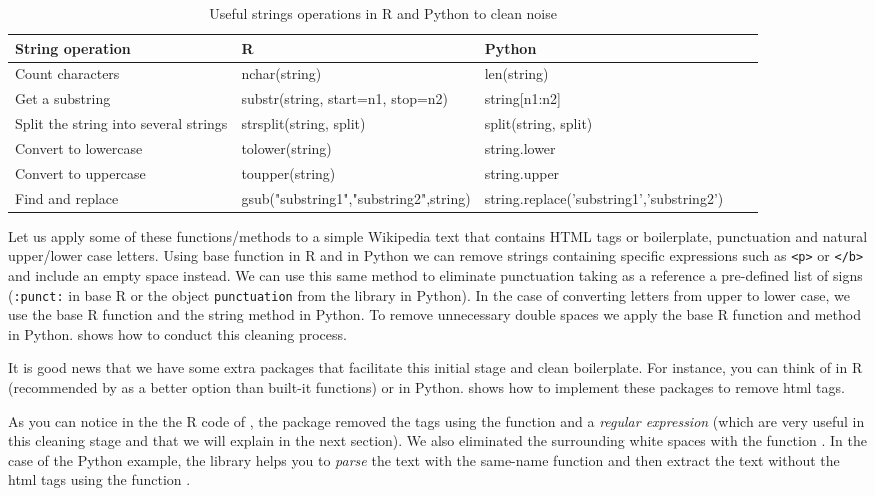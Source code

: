 \begin{table}
  \caption{\label{tab:stringoperations}Useful strings operations in R and Python to clean noise}{
  \begin{tabularx}{\textwidth}{lllll}
    \toprule
String operation      & R   & Python\\ \midrule
Count characters      & nchar(string) & len(string)  \\
Get a substring       & substr(string, start=n1, stop=n2) & string[n1:n2]            \\
Split the string into several strings   & strsplit(string, split) & split(string, split)             \\ 
Convert to lowercase  & tolower(string) & string.lower     \\ 
Convert to uppercase  & toupper(string) & string.upper     \\ 
Find and replace      & gsub("substring1","substring2",string) & string.replace('substring1','substring2') \\ 
    \bottomrule
  \end{tabularx}}{}
\end{table}

Let us apply some of these functions/methods to a simple Wikipedia text that contains HTML tags or boilerplate, punctuation and natural upper/lower case letters. Using base function  in R and  in Python we can remove strings containing specific expressions such as \texttt{<p>} or \texttt{</b>} and include an empty space instead. We can use this same method to eliminate punctuation taking as a reference a pre-defined list of signs (\texttt{:punct:} in base R or the object \texttt{punctuation} from the library  in Python). In the case of converting letters from upper to lower case, we use the base R function  and the string method  in Python. To remove unnecessary double spaces we apply the base R function  and method  in Python.  shows how to conduct this cleaning process.


It is good news that we have some extra packages that facilitate this initial stage and clean boilerplate. For instance, you can think of  in R (recommended by \citet{welbers2017text} as a better option than built-it functions) or  in Python.  shows how to implement these packages to remove html tags.


As you can notice in the the R code of , the package  removed the tags using the function  and a \emph{regular expression} (which are very useful in this cleaning stage and that we will explain in the next section). We also eliminated the surrounding white spaces with the function . In the case of the Python example, the library  helps you to \emph{parse} the text with the same-name function  and then extract the text without the html tags using the function .	